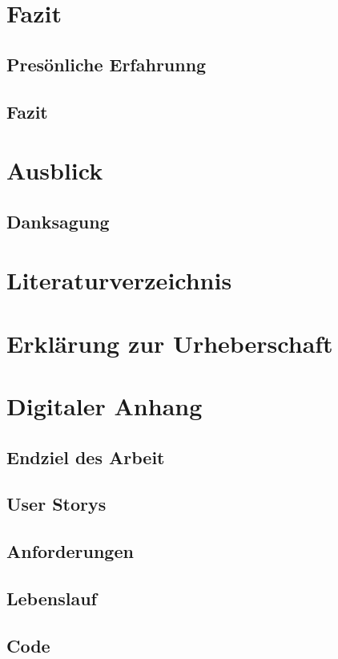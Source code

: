 \documentclass[a4paper,12pt]{article}
\begin{document}
\newpage
\section{Fazit}


\subsection{Presönliche Erfahrunng}


\subsection{Fazit}


\section{Ausblick}


\subsection*{Danksagung}


\newpage
%
\section*{Literaturverzeichnis}


\newpage
\section*{Erklärung zur Urheberschaft}


\newpage
\listoffigures


\listoftables %
\newpage
\section*{Digitaler Anhang}


\subsection{Endziel des Arbeit}


\subsection*{User Storys}


\subsection*{Anforderungen}


\subsection*{Lebenslauf}


\subsection*{Code}

\end{document}
